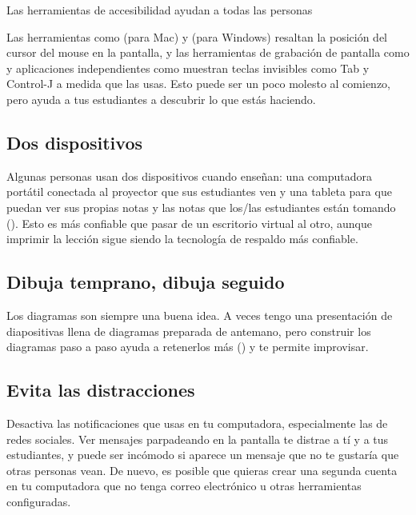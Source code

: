 \begin{aside}{Las herramientas de accesibilidad ayudan a todas las personas}

  Las herramientas como  (para Mac)
  y  (para Windows)
  resaltan la posición del cursor del mouse en la pantalla,
  y las herramientas de grabación de pantalla como 
  y aplicaciones independientes como 
  muestran teclas invisibles como Tab y Control-J a medida que las usas.
  Esto puede ser un poco molesto al comienzo,
  pero ayuda a tus estudiantes a descubrir lo que estás haciendo.
\end{aside}

\subsection*{Dos dispositivos}

Algunas personas usan dos dispositivos cuando enseñan:
una computadora portátil conectada al proyector que sus estudiantes ven
y una tableta para que puedan ver sus propias notas y las notas que los/las estudiantes están tomando ().
Esto es más confiable que pasar de un escritorio virtual al otro,
aunque imprimir la lección sigue siendo la tecnología de respaldo más confiable.

\subsection*{Dibuja temprano, dibuja seguido}

Los diagramas son siempre una buena idea.
A veces tengo una presentación de diapositivas llena de diagramas preparada de antemano,
pero construir los diagramas paso a paso ayuda a retenerlos más ()
y te permite improvisar.

\subsection*{Evita las distracciones}

Desactiva las notificaciones que usas en tu computadora,
especialmente las de redes sociales.
Ver mensajes parpadeando en la pantalla te distrae a tí y a tus estudiantes,
y puede ser incómodo si aparece un mensaje que no te gustaría que otras personas vean.
De nuevo,
es posible que quieras crear una segunda cuenta en tu computadora que no tenga correo electrónico u otras herramientas configuradas.

